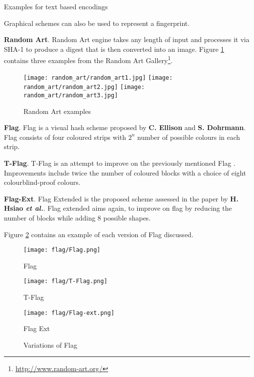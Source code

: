\begin{table}[h!]
    \centering
    
    \caption{Examples for text based encodings}
\end{table}

Graphical schemes can also be used to represent a fingerprint.

\textbf{Random Art}. Random Art engine\cite{perrig1999hash} takes any length of input and processes it via SHA-1 to produce a digest that is then converted into an image. Figure \ref{fig:randomArt} contains three examples from the Random Art Gallery\footnote{\url{http://www.random-art.org/}}.

\begin{figure}[h!]
    \centering
        \texttt{[image: random\_art/random\_art1.jpg]}
    \endminipage
        \texttt{[image: random\_art/random\_art2.jpg]}
    \endminipage
        \texttt{[image: random\_art/random\_art3.jpg]}
    \endminipage
    \caption{Random Art examples}
    \label{fig:randomArt}
\end{figure}

\textbf{Flag}. Flag is a visual hash scheme proposed by \textbf{C. Ellison} and \textbf{S. Dohrmann}\cite{ellison2003public}. Flag consists of four coloured strips with $2^n$ number of possible colours in each strip. 

\textbf{T-Flag}. T-Flag is an attempt to improve on the previously mentioned Flag \cite{lin2010spate}. Improvements include twice the number of coloured blocks with a choice of eight colourblind-proof colours.

\textbf{Flag-Ext}. Flag Extended is the proposed scheme assessed in the paper by \textbf{H. Hsiao \textit{et al.}}\cite{hsiao2009study}. Flag extended aims again, to improve on flag by reducing the number of blocks while adding 8 possible shapes.

Figure \ref{fig:flag} contains an example of each version of Flag discussed.

\begin{figure}[h!]
    \centering
        \texttt{[image: flag/Flag.png]}
        \caption{Flag}
    \endminipage
        \texttt{[image: flag/T-Flag.png]}
        \caption{T-Flag}
    \endminipage
        \texttt{[image: flag/Flag-ext.png]}
        \caption{Flag Ext}
    \endminipage
    \caption{Variations of Flag}
    \label{fig:flag}
\end{figure}

